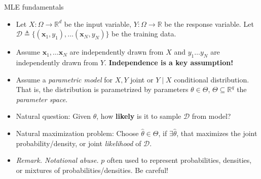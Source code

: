 \documentclass{beamer}
\numberwithin{equation}{section}
\begin{document}
\begin{frame}{MLE fundamentals}
    \begin{itemize}
        \item
        Let $ X : \Omega \rightarrow \mathbb{R}^d $ be the input variable,
        $ Y : \Omega \rightarrow \mathbb{R} $ be the response variable. Let
        $ \mathcal{D} \triangleq \{(\mathbf{x}_1, y_1), \ldots
        (\mathbf{x}_N, y_N)\} $ be the training data.

        \item
        Assume $ \mathbf{x}_1, \ldots \mathbf{x}_N $ are independently drawn
        from $ X $ and $ y_1 \ldots y_N $ are independently drawn from $ Y $.
        \textbf{Independence is a key assumption!}

        \item
        Assume a \textit{parametric model} for $ X, Y $ joint or $ Y \mid X $
        conditional distribution. That is, the distribution is parametrized
        by parameters $ \theta \in \Theta $, $ \Theta \subseteq \mathbb{R}^q $
        the \textit{parameter space}.

        \item
        Natural question: Given $ \theta $, how \textbf{likely} is it to
        sample $ \mathcal{D} $ from model?

        \item
        Natural maximization problem: Choose $ \hat{\theta} \in \Theta $, if
        $ \exists \hat{\theta} $, that maximizes the joint
        probability/density, or joint \textit{likelihood} of $ \mathcal{D} $.

        \item
        \textit{Remark. Notational abuse.} $ p $ often used to represent
        probabilities, densities, or mixtures of probabilities/densities.
        Be careful!
    \end{itemize}
\end{frame}
\end{document}
